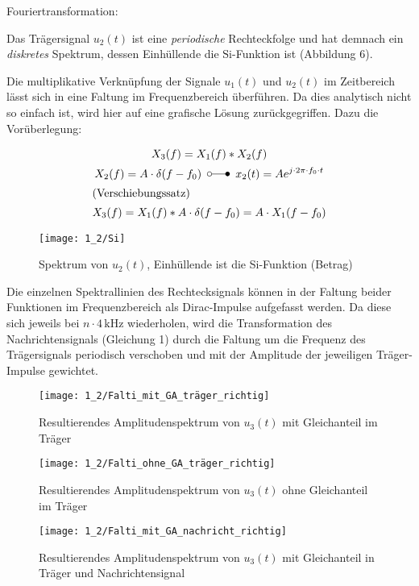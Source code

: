 \documentclass[a4paper, 12pt]{article}
\begin{document}
\noindent Fouriertransformation:

Das Trägersignal $u_2(t)$ ist eine \emph{periodische} Rechteckfolge und hat
demnach ein \emph{diskretes} Spektrum, dessen Einhüllende die $\textrm{Si}$-Funktion
ist (Abbildung 6).

Die multiplikative Verknüpfung der Signale $u_1(t)$ und $u_2(t)$ im Zeitbereich
lässt sich in eine Faltung im Frequenzbereich überführen. Da dies analytisch nicht
so einfach ist, wird hier auf eine grafische Lösung zurückgegriffen. Dazu die Vorüberlegung:

\begin{gather*}
  X_3(f) = X_1(f) * X_2(f) \\
  X_2(f) = A \cdot \delta{(f-f_0)} \,\ \laplace \,\ {x_2(t) = A e^{j \cdot 2\pi \cdot f_0 \cdot t}}\\ 
  \intertext{(Verschiebungssatz)}
  X_3(f) = X_1(f) * A \cdot \delta{(f-f_0)} = A \cdot X_1(f - f_0)
\end{gather*}


\begin{figure}[H]
  \texttt{[image: 1\_2/Si]}
  \caption{Spektrum von $u_2(t)$, Einhüllende ist die Si-Funktion (Betrag) }
\end{figure}
 
Die einzelnen Spektrallinien des Rechtecksignals können in der Faltung beider
Funktionen im Frequenzbereich als Dirac-Impulse aufgefasst werden. Da diese sich
jeweils bei $n \cdot 4 \, \si{\kilo\hertz}$ wiederholen, wird die Transformation
des Nachrichtensignals (Gleichung 1) durch die Faltung um die Frequenz des Trägersignals
periodisch verschoben und mit der Amplitude der jeweiligen Träger-Impulse gewichtet.

\begin{figure}[H]
  \texttt{[image: 1\_2/Falti\_mit\_GA\_träger\_richtig]}
  \caption{Resultierendes Amplitudenspektrum von $u_3(t)$ mit Gleichanteil im Träger}
\end{figure}

\begin{figure}[H]
  \texttt{[image: 1\_2/Falti\_ohne\_GA\_träger\_richtig]}
  \caption{Resultierendes Amplitudenspektrum von $u_3(t)$ ohne Gleichanteil im Träger}
\end{figure}

\begin{figure}[H]
  \texttt{[image: 1\_2/Falti\_mit\_GA\_nachricht\_richtig]}
  \caption{Resultierendes Amplitudenspektrum von $u_3(t)$ mit Gleichanteil in
    Träger und Nachrichtensignal}
\end{figure}
\end{document}
